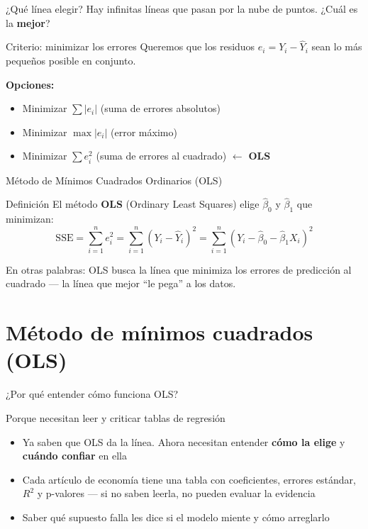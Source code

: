 \documentclass[aspectratio=169, 11pt]{beamer}
\begin{document}
\begin{frame}{¿Qué línea elegir?}
Hay infinitas líneas que pasan por la nube de puntos. ¿Cuál es la \textbf{mejor}?

\vspace{0.2cm}
\begin{block}{Criterio: minimizar los errores}
Queremos que los residuos $e_i = Y_i - \hat{Y}_i$ sean lo más pequeños posible en conjunto.
\end{block}

\vspace{0.2cm}
\textbf{Opciones:}
\begin{itemize}
  \item Minimizar $\sum |e_i|$ (suma de errores absolutos)
  \item Minimizar $\max |e_i|$ (error máximo)
  \item Minimizar $\sum e_i^2$ (suma de errores al cuadrado) $\leftarrow$ \textbf{OLS}
\end{itemize}
\end{frame}

\begin{frame}{Método de Mínimos Cuadrados Ordinarios (OLS)}
\begin{alertblock}{Definición}
El método \textbf{OLS} (Ordinary Least Squares) elige $\hat{\beta}_0$ y $\hat{\beta}_1$ que minimizan:
\[
\text{SSE} = \sum_{i=1}^{n} e_i^2 = \sum_{i=1}^{n} (Y_i - \hat{Y}_i)^2 = \sum_{i=1}^{n} (Y_i - \hat{\beta}_0 - \hat{\beta}_1 X_i)^2
\]
\end{alertblock}

\vspace{0.3cm}
En otras palabras: OLS busca la línea que minimiza los errores de predicción al cuadrado --- la línea que mejor ``le pega'' a los datos.
\end{frame}

\section{Método de mínimos cuadrados (OLS)}

\begin{frame}{¿Por qué entender cómo funciona OLS?}
\begin{exampleblock}{Porque necesitan leer y criticar tablas de regresión}
\small
\begin{itemize}\setlength{\itemsep}{2pt}
  \item Ya saben que OLS da la línea. Ahora necesitan entender \textbf{cómo la elige} y \textbf{cuándo confiar} en ella
  \item Cada artículo de economía tiene una tabla con coeficientes, errores estándar, $R^2$ y p-valores --- si no saben leerla, no pueden evaluar la evidencia
  \item Saber qué supuesto falla les dice si el modelo miente y cómo arreglarlo
\end{itemize}
\end{exampleblock}
\end{frame}
\end{document}
